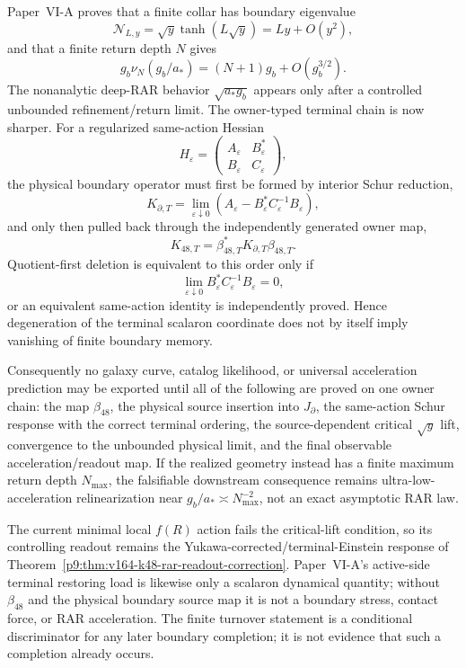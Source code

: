 \documentclass[12pt,a4paper]{article}
\begin{document}
\begin{theorem}
\label{p9:thm:v167-rar-limit-readout-firewall}
Paper~VI-A proves that a finite collar has boundary eigenvalue
\[
 \mathcal N_{L,y}=\sqrt y\tanh(L\sqrt y)=Ly+O(y^2),
\]
and that a finite return depth \(N\) gives
\[
 g_b\nu_N(g_b/a_*)=(N+1)g_b+O(g_b^{3/2}).
\]
The nonanalytic deep-RAR behavior \(\sqrt{a_*g_b}\) appears only after a
controlled unbounded refinement/return limit.  The owner-typed terminal chain
is now sharper.  For a regularized same-action Hessian
\[
 H_\varepsilon=
 \begin{pmatrix}
  A_\varepsilon & B_\varepsilon^{*}\\
  B_\varepsilon & C_\varepsilon
 \end{pmatrix},
\]
the physical boundary operator must first be formed by interior Schur reduction,
\[
 K_{\partial,T}
 =\lim_{\varepsilon\downarrow0}
 \left(
 A_\varepsilon-B_\varepsilon^{*}C_\varepsilon^{-1}B_\varepsilon
 \right),
\]
and only then pulled back through the independently generated owner map,
\[
 \boxed{
 K_{48,T}=\beta_{48,T}^{*}K_{\partial,T}\beta_{48,T}.}
\]
Quotient-first deletion is equivalent to this order only if
\[
 \boxed{
 \lim_{\varepsilon\downarrow0}
 B_\varepsilon^{*}C_\varepsilon^{-1}B_\varepsilon=0,}
\]
or an equivalent same-action identity is independently proved.  Hence degeneration of the terminal scalaron coordinate does not by itself
imply vanishing of finite boundary memory.

Consequently no galaxy curve, catalog likelihood, or universal acceleration
prediction may be exported until all of the following are proved on one owner
chain: the map \(\beta_{48}\), the physical source insertion into
\(J_\partial\), the same-action Schur response with the correct terminal
ordering, the source-dependent critical \(\sqrt y\) lift, convergence to the
unbounded physical limit, and the final observable acceleration/readout map.
If the realized geometry instead has a finite maximum return depth
\(N_{\max}\), the falsifiable downstream consequence remains ultra-low-
acceleration relinearization near
\(g_b/a_*\asymp N_{\max}^{-2}\), not an exact asymptotic RAR law.

The current minimal local \(f(R)\) action fails the critical-lift condition,
so its controlling readout remains the Yukawa-corrected/terminal-Einstein
response of Theorem~\ref{p9:thm:v164-k48-rar-readout-correction}.  Paper~VI-A's
active-side terminal restoring load is likewise only a scalaron dynamical
quantity; without \(\beta_{48}\) and the physical boundary source map it is
not a boundary stress, contact force, or RAR acceleration.  The finite turnover
statement is a conditional discriminator for any later boundary completion;
it is not evidence that such a completion already occurs.
\end{theorem}
\end{document}
